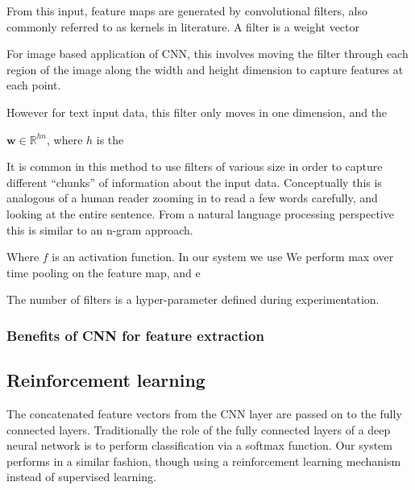 From this input, feature maps are generated by convolutional filters, also commonly referred to as kernels in literature. A filter is a weight vector 

For image based application of CNN, this involves moving the filter through each region of the image along the width and height dimension to capture features at each point.

However for text input data, this filter only moves in one dimension, and the 


$\mathbf{w} \in \mathbb{R}^{hn} $, where $h$ is the 







It is common in this method to use filters of various size in order to capture different ``chunks'' of information about the input data. Conceptually this is analogous of a human reader zooming in to read a few words carefully, and looking at the entire sentence. From a natural language processing perspective this is similar to an n-gram approach. 




Where $f$ is an activation function. In our system we use 
We perform max over time pooling on the feature map, and e


The number of filters is a hyper-parameter defined during experimentation. 




\subsubsection{Benefits of CNN for feature extraction}






\subsection{Reinforcement learning}

The concatenated feature vectors from the CNN layer are passed on to the fully connected layers. Traditionally the role of the fully connected layers of a deep neural network is to perform classification via a softmax function. Our system performs in a similar fashion, though using a reinforcement learning mechanism instead of supervised learning. 




